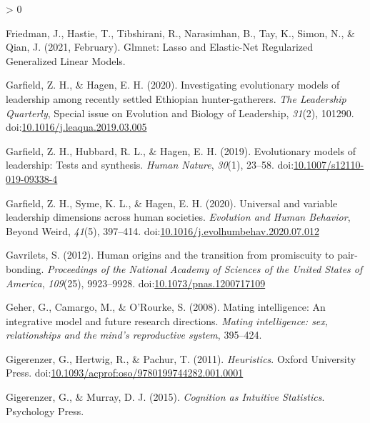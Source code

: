 \documentclass[
  11pt,
]{article}
\newlength{\cslhangindent}
\newenvironment{CSLReferences}[2] %
 {%
  \setlength{\parindent}{0pt}
  \ifodd #1 \everypar{\setlength{\hangindent}{\cslhangindent}}\ignorespaces\fi
  \ifnum #2 > 0
  \setlength{\parskip}{#2\baselineskip}
  \fi
 }%
 {}
\begin{document}
\begin{CSLReferences}{1}{0}
\leavevmode\hypertarget{ref-friedmanGlmnetLassoElasticNet2021}{}%
Friedman, J., Hastie, T., Tibshirani, R., Narasimhan, B., Tay, K., Simon, N., \& Qian, J. (2021, February). Glmnet: {Lasso} and {Elastic}-{Net Regularized Generalized Linear Models}.

\leavevmode\hypertarget{ref-garfieldInvestigatingEvolutionaryModels2020}{}%
Garfield, Z. H., \& Hagen, E. H. (2020). Investigating evolutionary models of leadership among recently settled {Ethiopian} hunter-gatherers. \emph{The Leadership Quarterly}, Special issue on {Evolution} and {Biology} of {Leadership}, \emph{31}(2), 101290. doi:\href{https://doi.org/10.1016/j.leaqua.2019.03.005}{10.1016/j.leaqua.2019.03.005}

\leavevmode\hypertarget{ref-garfieldEvolutionaryModelsLeadership2019b}{}%
Garfield, Z. H., Hubbard, R. L., \& Hagen, E. H. (2019). Evolutionary models of leadership: {Tests} and synthesis. \emph{Human Nature}, \emph{30}(1), 23--58. doi:\href{https://doi.org/10.1007/s12110-019-09338-4}{10.1007/s12110-019-09338-4}

\leavevmode\hypertarget{ref-garfieldUniversalVariableLeadership2020}{}%
Garfield, Z. H., Syme, K. L., \& Hagen, E. H. (2020). Universal and variable leadership dimensions across human societies. \emph{Evolution and Human Behavior}, Beyond {Weird}, \emph{41}(5), 397--414. doi:\href{https://doi.org/10.1016/j.evolhumbehav.2020.07.012}{10.1016/j.evolhumbehav.2020.07.012}

\leavevmode\hypertarget{ref-gavriletsHumanOriginsTransition2012}{}%
Gavrilets, S. (2012). Human origins and the transition from promiscuity to pair-bonding. \emph{Proceedings of the National Academy of Sciences of the United States of America}, \emph{109}(25), 9923--9928. doi:\href{https://doi.org/10.1073/pnas.1200717109}{10.1073/pnas.1200717109}

\leavevmode\hypertarget{ref-geherMatingIntelligenceIntegrative2008}{}%
Geher, G., Camargo, M., \& O'Rourke, S. (2008). Mating intelligence: {An} integrative model and future research directions. \emph{Mating intelligence: sex, relationships and the mind's reproductive system}, 395--424.

\leavevmode\hypertarget{ref-gigerenzerHeuristics2011}{}%
Gigerenzer, G., Hertwig, R., \& Pachur, T. (2011). \emph{Heuristics}. {Oxford University Press}. doi:\href{https://doi.org/10.1093/acprof:oso/9780199744282.001.0001}{10.1093/acprof:oso/9780199744282.001.0001}

\leavevmode\hypertarget{ref-gigerenzerCognitionIntuitiveStatistics2015}{}%
Gigerenzer, G., \& Murray, D. J. (2015). \emph{Cognition as {Intuitive Statistics}}. {Psychology Press}.


\end{CSLReferences}
\end{document}
